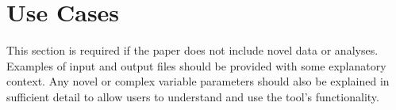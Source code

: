 \section*{Use Cases} %
This section is required if the paper does not include novel data or analyses. 
Examples of input and output files should be provided with some explanatory context.  Any novel or complex variable parameters should also be explained in sufficient detail to allow users to understand and use the tool's functionality.
